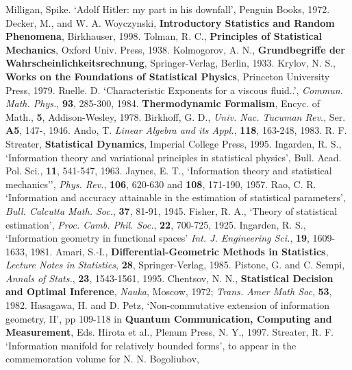 

\raggedright
\begin{thebibliography}{99}
 Milligan, Spike. `Adolf Hitler: my part in his downfall',
Penguin Books, 1972.
 Decker, M., and W. A. Woyczynski, {\bf Introductory
Statistics and Random Phenomena}, Birkhauser, 1998.
 Tolman, R. C., {\bf Principles of Statistical Mechanics},
Oxford Univ. Press, 1938.
 Kolmogorov, A. N., {\bf Grundbegriffe der
Wahrscheinlichkeitsrechnung}, Springer-Verlag, Berlin, 1933.
 Krylov, N. S., {\bf Works on the Foundations of
Statistical Physics}, Princeton University Press, 1979.
 Ruelle. D. `Characteristic Exponents for a viscous
fluid..', {\em Commun. Math. Phys.}, {\bf 93}, 285-300, 1984.
{\bf Thermodynamic Formalism}, Encyc. of Math., {\bf 5},
Addison-Wesley, 1978.
 Birkhoff, G. D., {\em Univ. Nac. Tucuman Rev.}, Ser.
{\bf A5}, 147-, 1946.
 Ando, T. {\em Linear Algebra and its Appl.}, {\bf 118},
163-248, 1983.
 R. F. Streater, {\bf Statistical Dynamics}, Imperial
College Press, 1995.
 Ingarden, R. S., `Information theory and variational
principles in statistical physics', {Bull. Acad. Pol. Sci.}, {\bf 11},
541-547, 1963.
 Jaynes, E. T., `Information theory and
statistical mechanics'', {\em Phys. Rev.}, {\bf 106}, 620-630 and
{\bf 108}, 171-190, 1957.
 Rao, C. R. `Information and accuracy attainable in the
estimation of statistical parameters', {\em Bull. Calcutta Math. Soc.},
{\bf 37}, 81-91, 1945.
 Fisher, R. A., `Theory of statistical estimation',
{\em Proc. Camb. Phil. Soc.}, {\bf 22}, 700-725, 1925.
 Ingarden, R. S., `Information geometry in functional
spaces' {\em Int. J. Engineering Sci.}, {\bf 19}, 1609-1633, 1981.
 Amari, S.-I., {\bf Differential-Geometric Methods in
Statistics}, {\em Lecture Notes in Statistics}, {\bf 28}, Springer-Verlag,
1985.
 Pistone, G. and C. Sempi, {\em Annals of Stats.}, {\bf 23},
1543-1561, 1995.
 Chentsov, N. N., {\bf Statistical Decision and Optimal
Inference}, {\em Nauka}, Moscow, 1972; {\em Trans. Amer Math Soc}, {\bf 53},
1982.
 Hasagawa, H. and D. Petz, `Non-commutative extension of
information geometry, II', pp 109-118 in
{\bf Quantum Communication, Computing
 and Measurement}, Eds. Hirota et al., Plenum Press, N. Y., 1997.
 Streater, R. F. `Information manifold for relatively
bounded forms', to appear in the commemoration volume for N. N. Bogoliubov,

\end{thebibliography}
